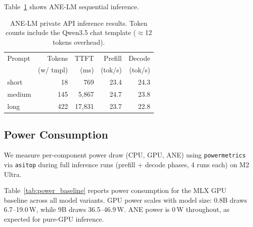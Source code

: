 \documentclass[11pt]{article}
\begin{document}
Table~\ref{tab:ane_lm} shows ANE-LM sequential inference.

\begin{table}[h]
\centering
\small
\begin{tabular}{@{}lrrrr@{}}
\toprule
Prompt & Tokens & TTFT & Prefill & Decode \\
 & (w/ tmpl) & (ms) & (tok/s) & (tok/s) \\
\midrule
short & 18 & 769 & 23.4 & 24.3 \\
medium & 145 & 5{,}867 & 24.7 & 23.8 \\
long & 422 & 17{,}831 & 23.7 & 22.8 \\
\bottomrule
\end{tabular}
\caption{ANE-LM private API inference results. Token counts include the
  Qwen3.5 chat template ($\approx$12 tokens overhead).}
\label{tab:ane_lm}
\end{table}

\subsection{Power Consumption}
\label{sec:power_consumption}

We measure per-component power draw (CPU, GPU, ANE) using
\texttt{powermetrics} via \texttt{asitop} during full inference runs
(prefill + decode phases, 4 runs each) on M2 Ultra.

Table~\ref{tab:power_baseline} reports power consumption for the MLX GPU
baseline across all model variants.
GPU power scales with model size: 0.8B draws 6.7--19.0\,W, while 9B
draws 36.5--46.9\,W.
ANE power is 0\,W throughout, as expected for pure-GPU inference.
\end{document}
